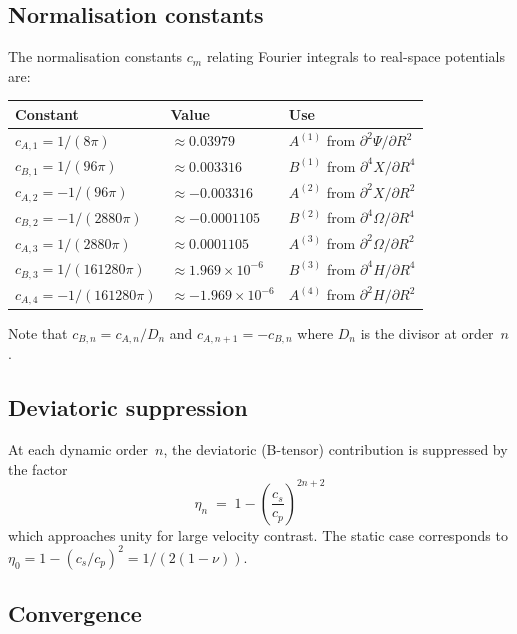 \documentclass[11pt,a4paper]{article}
\theoremstyle{plain}
\theoremstyle{remark}
\begin{document}
\subsection{Normalisation constants}

The normalisation constants $c_m$ relating Fourier integrals to
real-space potentials are:

\begin{center}
\begin{tabular}{lll}
\toprule
Constant & Value & Use \\
\midrule
$c_{A,1} = 1/(8\pi)$ & $\approx 0.03979$ & $A^{(1)}$ from $\partial^2\Psi/\partial R^2$ \\
$c_{B,1} = 1/(96\pi)$ & $\approx 0.003316$ & $B^{(1)}$ from $\partial^4 X/\partial R^4$ \\
$c_{A,2} = -1/(96\pi)$ & $\approx -0.003316$ & $A^{(2)}$ from $\partial^2 X/\partial R^2$ \\
$c_{B,2} = -1/(2880\pi)$ & $\approx -0.0001105$ & $B^{(2)}$ from $\partial^4\Omega/\partial R^4$ \\
$c_{A,3} = 1/(2880\pi)$ & $\approx 0.0001105$ & $A^{(3)}$ from $\partial^2\Omega/\partial R^2$ \\
$c_{B,3} = 1/(161280\pi)$ & $\approx 1.969\times 10^{-6}$ & $B^{(3)}$ from $\partial^4 H/\partial R^4$ \\
$c_{A,4} = -1/(161280\pi)$ & $\approx -1.969\times 10^{-6}$ & $A^{(4)}$ from $\partial^2 H/\partial R^2$ \\
\bottomrule
\end{tabular}
\end{center}

Note that $c_{B,n} = c_{A,n}/D_n$ and $c_{A,n+1} = -c_{B,n}$ where
$D_n$ is the divisor at order~$n$.

\subsection{Deviatoric suppression}

At each dynamic order~$n$, the deviatoric (B-tensor) contribution is
suppressed by the factor
\begin{equation}
  \boxed{
  \eta_n \;=\; 1 - \left(\frac{c_s}{c_p}\right)^{2n+2}
  }
  \label{eq:eta-n}
\end{equation}
which approaches unity for large velocity contrast.  The static case
corresponds to $\eta_0 = 1 - (c_s/c_p)^2 = 1/(2(1-\nu))$.

\subsection{Convergence}
\end{document}
